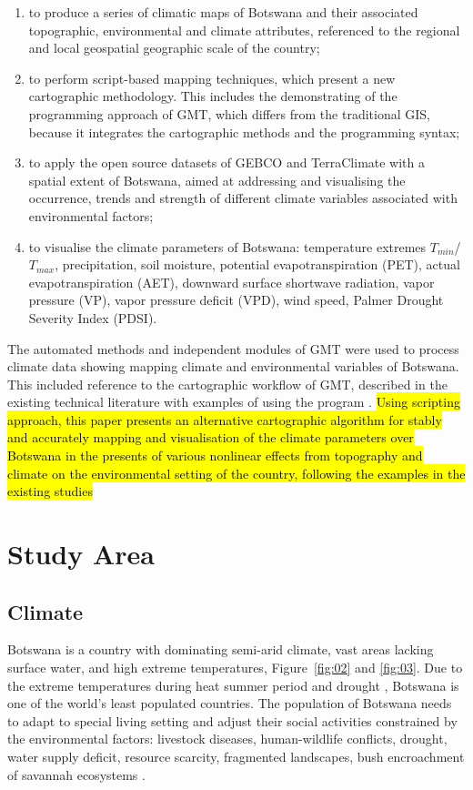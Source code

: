 \documentclass[ijgi,article,submit,pdftex,moreauthors]{Definitions/mdpi}
\begin{document}
\begin{enumerate}[label=\roman*]
	\item	to produce a series of climatic maps of Botswana and their associated topographic, environmental and climate attributes, referenced to the regional and local geospatial geographic scale of the country; 
	\item to perform script-based mapping techniques, which present a new cartographic methodology. This includes the demonstrating of the programming approach of GMT, which differs from the traditional GIS,  because it integrates the cartographic methods and the programming syntax;
	\item to apply the open source datasets of GEBCO and TerraClimate with a spatial extent of Botswana, aimed at addressing and visualising the occurrence, trends and strength of different climate variables associated with environmental factors;
	\item to visualise the climate parameters of Botswana: temperature extremes $T_{min}$/$T_{max}$, precipitation, soil moisture, potential evapotranspiration (PET), actual evapotranspiration (AET), downward surface shortwave radiation, vapor pressure (VP), vapor pressure deficit (VPD), wind speed, Palmer Drought Severity Index (PDSI).
\end{enumerate}
    
The automated methods and independent modules of GMT were used to process climate data showing mapping climate and environmental variables of Botswana. This included reference to the cartographic workflow of GMT, described in the existing technical literature with examples of using the program \cite{Kasalica,Lemenkova2019106,8588718,Lemenkova202205,4814952,Lemenkova201994}. \hl{Using scripting approach, this paper presents an alternative cartographic algorithm for stably and accurately mapping and visualisation of the climate parameters over Botswana in the presents of various nonlinear effects from topography and climate on the environmental setting of the country, following the examples in the existing studies} \cite{6049609,5649810}

\section{Study Area}

\subsection{Climate}
Botswana is a country with dominating semi-arid climate, vast areas lacking surface water, and high extreme temperatures, Figure~\ref{fig:02} and \ref{fig:03}. Due to the extreme temperatures during heat summer period and drought \cite{Hemming,Karikari}, Botswana is one of the world’s least populated countries. The population of Botswana needs to adapt to special living setting and adjust their social activities constrained by the environmental factors: livestock diseases, human-wildlife conflicts, drought, water supply deficit, resource scarcity, fragmented landscapes, bush encroachment of savannah ecosystems \cite{Badimo,Basupi,Charis}. 
    
\end{document}
